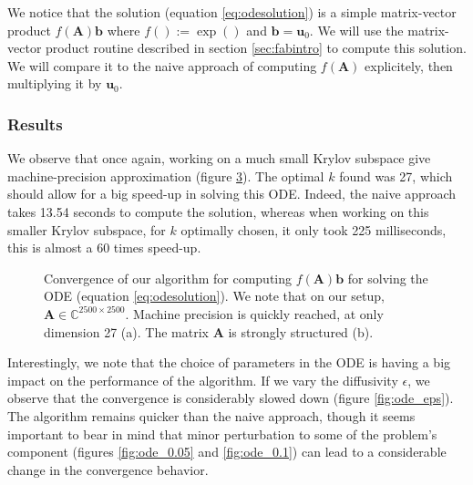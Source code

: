 \documentclass[11pt]{article}
\numberwithin{equation}{section}
\begin{document}
We notice that the solution (equation \ref{eq:odesolution}) is a simple matrix-vector product $f(\mathbf{A})\mathbf{b}$ where $f() := \exp()$ and $\mathbf{b} = \mathbf{u}_0$. We will use the matrix-vector product routine described in section \ref{sec:fabintro} to compute this solution. We will compare it to the naive approach of computing $f(\mathbf{A})$ explicitely, then multiplying it by $\mathbf{u}_0$.
\subsubsection{Results}

We observe that once again, working on a much small Krylov subspace give machine-precision approximation (figure \ref{fig:ode_comp}). The optimal $k$ found was 27, which should allow for a big speed-up in solving this ODE. Indeed, the naive approach takes 13.54 seconds to compute the solution, whereas when working on this smaller Krylov subspace, for $k$ optimally chosen, it only took 225 milliseconds, this is almost a 60 times speed-up.

\begin{figure}
    \begin{subfigure}[b]{.45\linewidth}
        
        \caption{}
        \label{fig:ode_conv}
    \end{subfigure}\hspace{.05\linewidth}
    \begin{subfigure}[b]{.45\linewidth}
        
        \caption{}
        \label{fig:ose_sparse}
    \end{subfigure}
    \caption{Convergence of our algorithm for computing $f(\mathbf{A})\mathbf{b}$ for solving the ODE (equation \ref{eq:odesolution}). We note that on our setup, $\mathbf{A}\in\mathbb{C}^{2500\times 2500}$. Machine precision is quickly reached, at only dimension 27 (a). The matrix $\mathbf{A}$ is strongly structured (b).}
    \label{fig:ode_comp}
\end{figure}

Interestingly, we note that the choice of parameters in the ODE is having a big impact on the performance of the algorithm. If we vary the diffusivity $\epsilon$, we observe that the convergence is considerably slowed down (figure \ref{fig:ode_eps}). The algorithm remains quicker than the naive approach, though it seems important to bear in mind that minor perturbation to some of the problem's component (figures \ref{fig:ode_0.05} and \ref{fig:ode_0.1}) can lead to a considerable change in the convergence behavior.
\end{document}
